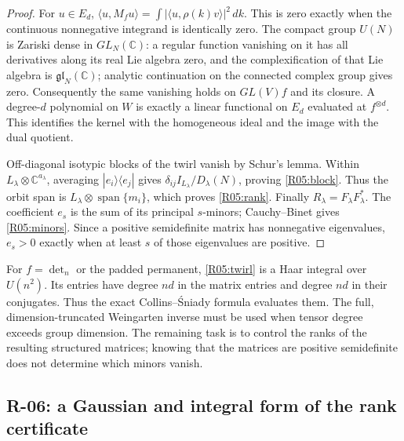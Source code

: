 \documentclass[11pt,a4paper]{article}
\theoremstyle{definition}\newtheorem{definition}{Definition}
\begin{document}
\begin{proof}
For $u\in E_d$,
$\langle u,M_fu\rangle=\int|\langle u,\rho(k)v\rangle|^2\,dk$.
This is zero exactly when the continuous nonnegative integrand is
identically zero. The compact group $U(N)$ is Zariski dense in
$GL_N(\mathbb C)$: a regular function vanishing on it has all derivatives
along its real Lie algebra zero, and the complexification of that Lie
algebra is $\mathfrak{gl}_N(\mathbb C)$; analytic continuation on the
connected complex group gives zero. Consequently the same vanishing
holds on $GL(V)f$ and its closure. A degree-$d$ polynomial on $W$ is
exactly a linear functional on $E_d$ evaluated at $f^{\otimes d}$.
This identifies the kernel with the homogeneous ideal and the image
with the dual quotient.

Off-diagonal isotypic blocks of the twirl vanish by Schur's lemma.
Within $L_\lambda\otimes\mathbb C^{a_\lambda}$, averaging
$|e_i\rangle\langle e_j|$ gives
$\delta_{ij}I_{L_\lambda}/D_\lambda(N)$, proving
\eqref{R05:block}. Thus the orbit span is
$L_\lambda\otimes\operatorname{span}\{m_i\}$, which proves
\eqref{R05:rank}. Finally $R_\lambda=F_\lambda F_\lambda^*$.
The coefficient $e_s$ is the sum of its principal $s$-minors;
Cauchy--Binet gives \eqref{R05:minors}. Since a positive semidefinite
matrix has nonnegative eigenvalues, $e_s>0$ exactly when at least $s$
of those eigenvalues are positive.
\end{proof}

For $f=\det_n$ or the padded permanent, \eqref{R05:twirl} is a Haar
integral over $U(n^2)$. Its entries have degree $nd$ in the matrix
entries and degree $nd$ in their conjugates. Thus the exact
Collins--\'Sniady formula evaluates them. The full, dimension-truncated
Weingarten inverse must be used when tensor degree exceeds group
dimension. The remaining task is to control the ranks of the resulting
structured matrices; knowing that the matrices are positive
semidefinite does not determine which minors vanish.

\subsection{R-06: a Gaussian and integral form of the rank certificate}
\end{document}
